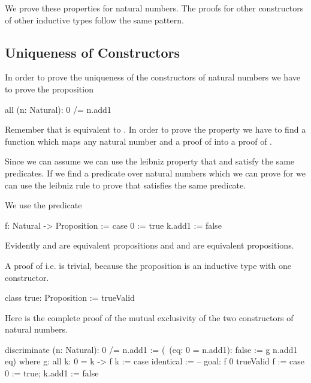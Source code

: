 We prove these properties for natural numbers. The proofs for other constructors
of other inductive types follow the same pattern.




\subsection{Uniqueness of Constructors}

In order to prove the uniqueness of the constructors of natural numbers we have
to prove the proposition

\begin{alba}
    all (n: Natural): 0 /= n.add1
\end{alba}

Remember that  is equivalent to . In order to prove the property we have to find a function which
maps any natural number  and a proof of  into a
proof of .

Since we can assume  we can use the leibniz property that
 and  satisfy the same predicates. If we find a
predicate over natural numbers which we can prove for  we can use the
leibniz rule to prove that  satisfies the same predicate.

We use the predicate
\begin{alba}
    f: Natural -> Proposition :=
        case
            0 :=
                true
            k.add1 :=
                false
\end{alba}

Evidently  and  are equivalent propositions and  and  are equivalent propositions.

A proof of  i.e.  is trivial, because the proposition
 is an inductive type with one constructor.

\begin{alba}
    class true: Proposition := trueValid
\end{alba}


Here is the complete proof of the mutual exclusivity of the two constructors of
natural numbers.


\begin{alba}
    discriminate (n: Natural): 0 /= n.add1
    :=
        (\ (eq: 0 = n.add1): false := g n.add1 eq)
        where
            g: all k: 0 = k -> f k :=
                case
                    identical :=
                        -- goal: f 0
                        trueValid
            f :=
                case 0 := true; k.add1 := false
\end{alba}


